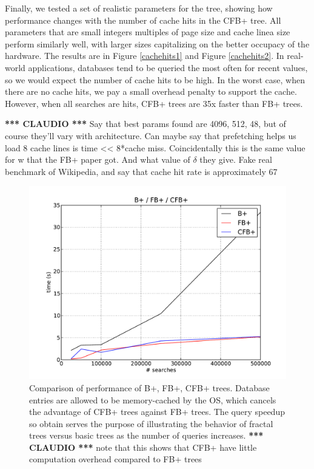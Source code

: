 \documentclass{article}
\newcommand{\claudio}{\textcolor{Cerulean}{\textbf{*** CLAUDIO ***} }}
\begin{document}
Finally, we tested a set of realistic parameters for the tree, showing how performance changes with the number
of cache hits in the CFB+ tree. All parameters that are small integers multiples of page size and cache linea
size perform similarly well, with larger sizes capitalizing on the better occupacy of the hardware.
The results are in Figure \ref{cachehits1} and Figure \ref{cachehits2}.
In real-world applications, databases tend to be queried the most often for recent values,
so we would expect the number of cache hits to be high.
In the worst case, when there are no cache hits, we pay a small overhead penalty to support the cache.
However, when all searches are hits, CFB+ trees are 35x faster than FB+ trees.

\claudio
Say that best params found are 4096, 512, 48, but of course they'll vary with architecture. Can maybe say that prefetching helps us load 8 cache lines is time << 8*cache miss. Coincidentally this is the same value for w that the FB+ paper got. And what value of $\delta$ they give. Fake real benchmark of Wikipedia, and say that cache hit rate is approximately 67%
 
\begin{figure}[p]
\begin{center}
\includegraphics[width=350pt]{base}
\end{center}
\caption{
Comparison of performance of B+, FB+, CFB+ trees.
Database entries are allowed to be memory-cached by the OS, which cancels the advantage of CFB+ trees against FB+ trees.
The query speedup so obtain serves the purpose
of illustrating the behavior of fractal trees versus basic trees as the number of queries increases.
\claudio note that this shows that CFB+ have little computation overhead compared to FB+ trees
}
\label{fig:base}
\end{figure}
\end{document}
